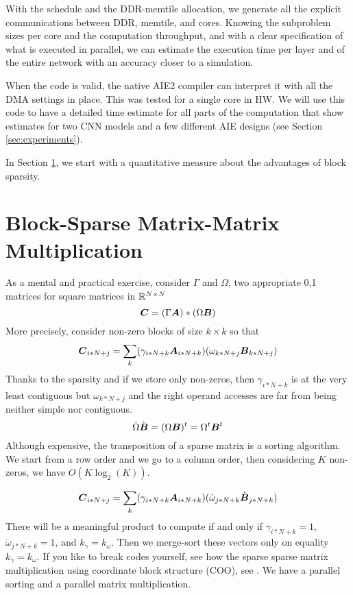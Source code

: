 \documentclass[conference]{IEEEtran}
\begin{document}
With the schedule and the DDR-memtile allocation, we generate all the
explicit communications between DDR, memtile, and cores. Knowing the
subproblem sizes per core and the computation throughput, and with a
clear specification of what is executed in parallel, we can estimate
the execution time per layer and of the entire network with an
accuracy closer to a simulation.

When the code is valid, the native AIE2 compiler can interpret it with
all the DMA settings in place. This was tested for a single core in
HW. We will use this code to have a detailed time estimate for all
parts of the computation that show estimates for two CNN models and a
few different AIE designs (see Section \ref{sec:experiments}).

In Section \ref{sec:motivation}, we start with a quantitative measure
about the advantages of block sparsity.

\section{Block-Sparse Matrix-Matrix Multiplication}
\label{sec:motivation}

As a mental and practical exercise, consider $\Gamma$ and $\Omega$,
two appropriate 0,1 matrices for square matrices in $\mathbb{R}^{N\times N}$
\begin{equation}
  {\boldsymbol C} = (\Gamma {\boldsymbol A}) * (\Omega {\boldsymbol B})
\end{equation}
More precisely, consider non-zero blocks of size $k\times k$ so that
\begin{equation}
  {\boldsymbol C}_{i*N+j} = \sum_k ( \gamma_{i*N+k} {\boldsymbol A}_{i*N+k} ) (\omega_{k*N+j} {\boldsymbol B}_{k*N+j})
\end{equation}
Thanks to the sparsity and if we store only non-zeros, then
$\gamma_{i*N+k}$ is at the very least contiguous but $\omega_{k*N+j}$
and the right operand accesses are far from being neither simple nor
contiguous.
\begin{equation}
  \dot{\Omega}\dot{{\boldsymbol B}} = (\Omega {\boldsymbol B})^t =\Omega^t {\boldsymbol B}^t 
\end{equation}
Although expensive, the transposition of a sparse matrix is a sorting
algorithm. We start from a row order and we go to a column order, then
considering $K$ non-zeros, we have $O(K\log_2(K))$.

\begin{equation}
  {\boldsymbol C}_{i*N+j} = \sum_k ( \gamma_{i*N+k} {\boldsymbol A}_{i*N+k} ) (\dot{\omega}_{j*N+k} \dot{{\boldsymbol B}}_{j*N+k})
\end{equation}
There will be a meaningful product to compute if and only if
$\gamma_{i*N+k} =1$, $\dot{\omega}_{j*N+k} =1$, and
$k_\gamma=k_\omega$.  Then we merge-sort these vectors only on
equality $k_\gamma = k_\omega$. If you like to break codes yourself,
see how the sparse sparse matrix multiplication using coordinate block
structure (COO), see \cite{PaoloG2020}. We have a parallel sorting and
a parallel matrix multiplication.
\end{document}
